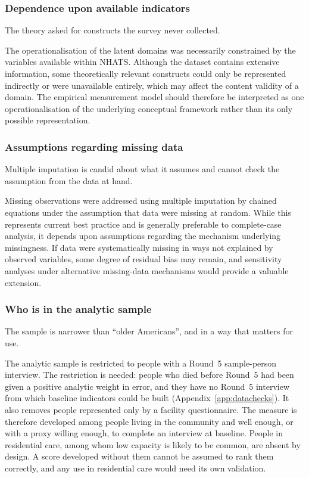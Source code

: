 \subsubsection{Dependence upon available indicators}

The theory asked for constructs the survey never collected.

The operationalisation of the latent domains was necessarily constrained by the variables available within NHATS. Although the dataset contains extensive information, some theoretically relevant constructs could only be represented indirectly or were unavailable entirely, which may affect the content validity of a domain. The empirical measurement model should therefore be interpreted as one operationalisation of the underlying conceptual framework rather than its only possible representation.

\subsubsection{Assumptions regarding missing data}

Multiple imputation is candid about what it assumes and cannot check the
assumption from the data at hand.

Missing observations were addressed using multiple imputation by chained equations \citep{vanbuuren_2011} under the assumption that data were missing at random. While this represents current best practice and is generally preferable to complete-case analysis, it depends upon assumptions regarding the mechanism underlying missingness. If data were systematically missing in ways not explained by observed variables, some degree of residual bias may remain, and sensitivity analyses under alternative missing-data mechanisms would provide a valuable extension.

\subsubsection{Who is in the analytic sample}

The sample is narrower than ``older Americans'', and in a way that matters for
use.

The analytic sample is restricted to people with a Round~5 sample-person
interview. The restriction is needed: people who died before Round~5 had been given
a positive analytic weight in error, and they have no Round~5 interview from which
baseline indicators could be built (Appendix~\ref{app:datachecks}). It also removes
people represented only by a facility questionnaire. The measure is therefore
developed among people living in the community and well enough, or with a proxy
willing enough, to complete an interview at baseline. People in residential care,
among whom low capacity is likely to be common, are absent by design. A score
developed without them cannot be assumed to rank them correctly, and any use in
residential care would need its own validation.

